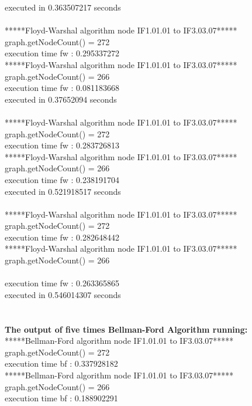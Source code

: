 executed in 0.363507217 seconds\\
\\
*****Floyd-Warshal algorithm node IF1.01.01 to IF3.03.07*****\\
graph.getNodeCount() = 272\\
execution time fw : 0.295337272\\
*****Floyd-Warshal algorithm node IF1.01.01 to IF3.03.07*****\\
graph.getNodeCount() = 266\\
execution time fw : 0.081183668\\
executed in 0.37652094 seconds\\
\\
*****Floyd-Warshal algorithm node IF1.01.01 to IF3.03.07*****\\
graph.getNodeCount() = 272\\
execution time fw : 0.283726813\\
*****Floyd-Warshal algorithm node IF1.01.01 to IF3.03.07*****\\
graph.getNodeCount() = 266\\
execution time fw : 0.238191704\\
executed in 0.521918517 seconds\\
\\
*****Floyd-Warshal algorithm node IF1.01.01 to IF3.03.07*****\\
graph.getNodeCount() = 272\\
execution time fw : 0.282648442\\
*****Floyd-Warshal algorithm node IF1.01.01 to IF3.03.07*****\\
graph.getNodeCount() = 266\\
\\execution time fw : 0.263365865
\\executed in 0.546014307 seconds
\\\\
\\\textbf{The output of five times Bellman-Ford Algorithm running:}
\\*****Bellman-Ford algorithm node IF1.01.01 to IF3.03.07*****
\\graph.getNodeCount() = 272
\\execution time bf : 0.337928182
\\*****Bellman-Ford algorithm node IF1.01.01 to IF3.03.07*****
\\graph.getNodeCount() = 266
\\execution time bf : 0.188902291
